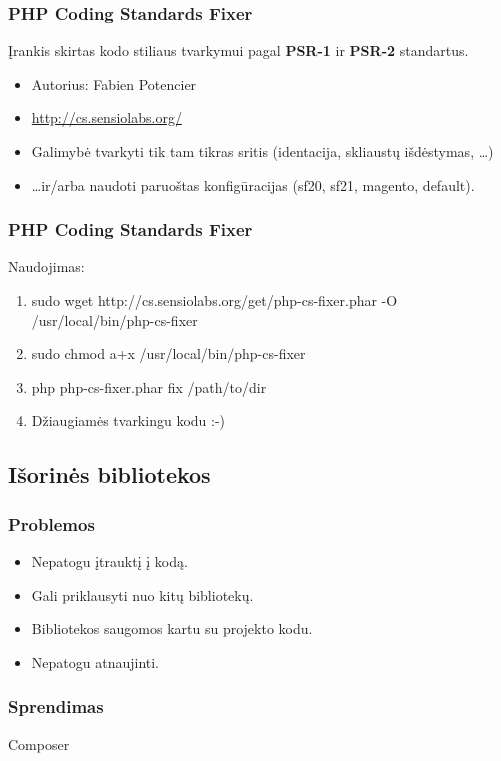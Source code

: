 \documentclass[12pt,a4paper]{beamer}
\begin{document}
\begin{frame}
    \frametitle{PHP Coding Standards Fixer}
    Įrankis skirtas kodo stiliaus tvarkymui pagal \textbf{PSR-1} ir \textbf{PSR-2} standartus.
    \begin{itemize}
        \item Autorius: Fabien Potencier
        \item \url{http://cs.sensiolabs.org/}
        \item Galimybė tvarkyti tik tam tikras sritis (identacija, skliaustų išdėstymas, \dots)
        \item \dots ir/arba naudoti paruoštas konfigūracijas (sf20, sf21, magento, default).
    \end{itemize}
\end{frame}

\begin{frame}
    \frametitle{PHP Coding Standards Fixer}
    Naudojimas:
    {\small
    \begin{enumerate}
        \item sudo wget http://cs.sensiolabs.org/get/php-cs-fixer.phar -O /usr/local/bin/php-cs-fixer
        \item sudo chmod a+x /usr/local/bin/php-cs-fixer
        \item php php-cs-fixer.phar fix /path/to/dir
        \item Džiaugiamės tvarkingu kodu :-)
    \end{enumerate}
    }
\end{frame}

\subsection{Išorinės bibliotekos}
\begin{frame}
    \frametitle{Problemos}
    \begin{itemize}
        \item Nepatogu įtrauktį į kodą.
        \item Gali priklausyti nuo kitų bibliotekų.
        \item Bibliotekos saugomos kartu su projekto kodu.
        \item Nepatogu atnaujinti.
    \end{itemize}
\end{frame}

\begin{frame}[fragile]
    \frametitle{Sprendimas}

    {\Huge Composer}
\end{frame}
\end{document}
